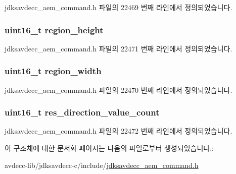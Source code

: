jdksavdecc\+\_\+aem\+\_\+command.\+h 파일의 22469 번째 라인에서 정의되었습니다.

\subsubsection[{\texorpdfstring{region\+\_\+height}{region_height}}]{\setlength{\rightskip}{0pt plus 5cm}uint16\+\_\+t region\+\_\+height}\hypertarget{structjdksavdecc__aem__command__get__matrix_afac2ca21b44ee4f90b555f2609321c60}{}\label{structjdksavdecc__aem__command__get__matrix_afac2ca21b44ee4f90b555f2609321c60}


jdksavdecc\+\_\+aem\+\_\+command.\+h 파일의 22471 번째 라인에서 정의되었습니다.

\subsubsection[{\texorpdfstring{region\+\_\+width}{region_width}}]{\setlength{\rightskip}{0pt plus 5cm}uint16\+\_\+t region\+\_\+width}\hypertarget{structjdksavdecc__aem__command__get__matrix_a87453b735ebc871f58f507139df28b89}{}\label{structjdksavdecc__aem__command__get__matrix_a87453b735ebc871f58f507139df28b89}


jdksavdecc\+\_\+aem\+\_\+command.\+h 파일의 22470 번째 라인에서 정의되었습니다.

\subsubsection[{\texorpdfstring{res\+\_\+direction\+\_\+value\+\_\+count}{res_direction_value_count}}]{\setlength{\rightskip}{0pt plus 5cm}uint16\+\_\+t res\+\_\+direction\+\_\+value\+\_\+count}\hypertarget{structjdksavdecc__aem__command__get__matrix_a0f34ba05787e5027402de5f250c3a5a6}{}\label{structjdksavdecc__aem__command__get__matrix_a0f34ba05787e5027402de5f250c3a5a6}


jdksavdecc\+\_\+aem\+\_\+command.\+h 파일의 22472 번째 라인에서 정의되었습니다.



이 구조체에 대한 문서화 페이지는 다음의 파일로부터 생성되었습니다.\+:\begin{DoxyCompactItemize}
\item 
avdecc-\/lib/jdksavdecc-\/c/include/\hyperlink{jdksavdecc__aem__command_8h}{jdksavdecc\+\_\+aem\+\_\+command.\+h}\end{DoxyCompactItemize}

